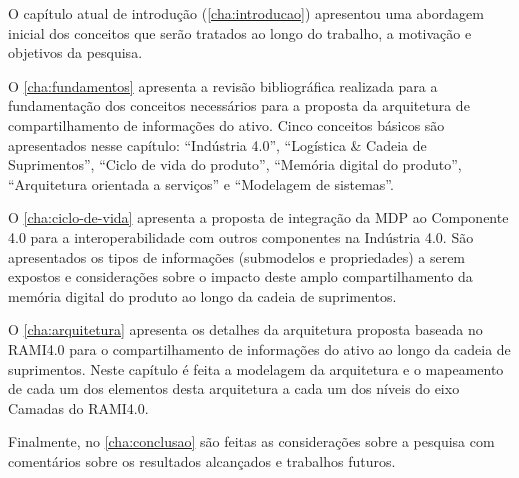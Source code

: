 O capítulo atual de introdução (\autoref{cha:introducao}) apresentou uma abordagem inicial dos conceitos que serão tratados ao longo do trabalho, a motivação e objetivos da pesquisa.

O \autoref{cha:fundamentos} apresenta a revisão bibliográfica realizada para a fundamentação dos conceitos necessários para a proposta da arquitetura de compartilhamento de informações do ativo. Cinco conceitos básicos são apresentados nesse capítulo: ``Indústria 4.0'', ``Logística \& Cadeia de Suprimentos'', ``Ciclo de vida do produto'', ``Memória digital do produto'', ``Arquitetura orientada a serviços'' e ``Modelagem de sistemas''.

O \autoref{cha:ciclo-de-vida} apresenta a proposta de integração da MDP ao Componente 4.0 para a interoperabilidade com outros componentes na Indústria 4.0. São apresentados os tipos de informações (submodelos e propriedades) a serem expostos e considerações sobre o impacto deste amplo compartilhamento da memória digital do produto ao longo da cadeia de suprimentos.

O \autoref{cha:arquitetura} apresenta os detalhes da arquitetura proposta baseada no RAMI4.0 para o compartilhamento de informações do ativo ao longo da cadeia de suprimentos. Neste capítulo é feita a modelagem da arquitetura e o mapeamento de cada um dos elementos desta arquitetura a cada um dos níveis do eixo Camadas do RAMI4.0.

Finalmente, no \autoref{cha:conclusao} são feitas as considerações sobre a pesquisa com comentários sobre os resultados alcançados e trabalhos futuros.
